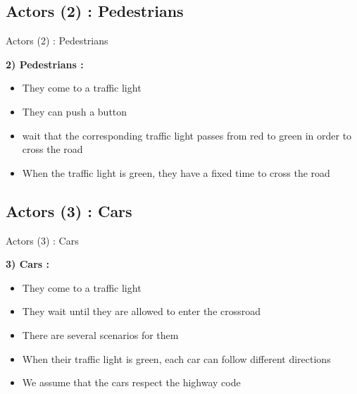 \documentclass{bredelebeamer}
\begin{document}
\subsection{Actors (2) : Pedestrians }

\begin{frame}{Actors (2) : Pedestrians }


\textbf{2) Pedestrians : }


\begin{itemize}

\item They come to a traffic light

\item They can push a button

\item wait that the corresponding traffic light passes from red to green in order to cross the road

\item When the traffic light is green, they have a fixed time to cross the road

\end{itemize}


\end{frame}


\subsection{Actors (3) : Cars }

\begin{frame}{Actors (3) : Cars }


\textbf{3) Cars : }


\begin{itemize}

\item They come to a traffic light

\item They wait until they are allowed to enter the crossroad

\item There are several scenarios for them

\item When their traffic light is green, each car can follow different directions

\item We assume that the cars respect the highway code

\end{itemize}


\end{frame}
\end{document}

